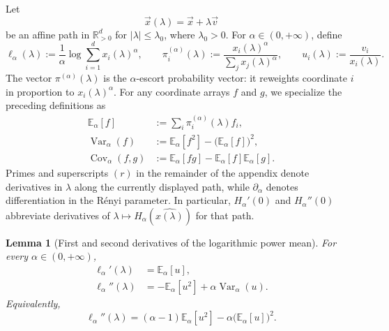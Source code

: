 \documentclass[aps,pra,11pt,onecolumn,nofootinbib,tightenlines]{revtex4-2}
\newtheorem{lemma}[theorem]{Lemma}
\theoremstyle{definition}
\begin{document}
Let
\begin{equation}
 \vec x(\lambda)=\vec x+\lambda\vec v
 \label{eq:app-affine-path}
\end{equation}
be an affine path in $\mathbb R^d_{>0}$ for $|\lambda|\leq\lambda_0$, where
$\lambda_0>0$.  For $\alpha\in(0,+\infty)$, define
\begin{equation}
 \ell_\alpha(\lambda)
 :=\frac1\alpha\log\sum_{i=1}^d x_i(\lambda)^\alpha,
 \qquad
 \pi_i^{(\alpha)}(\lambda)
 :=\frac{x_i(\lambda)^\alpha}{\sum_jx_j(\lambda)^\alpha},
 \qquad
 u_i(\lambda):=\frac{v_i}{x_i(\lambda)}.
 \label{eq:app-ell-pi-u}
\end{equation}
The vector $\pi^{(\alpha)}(\lambda)$ is the $\alpha$-escort probability vector:
it reweights coordinate $i$ in proportion to $x_i(\lambda)^\alpha$.
For any coordinate arrays $f$ and $g$, we specialize the preceding definitions
as
\begin{align}
\mathbb E_\alpha[f]
&:=\sum_i\pi_i^{(\alpha)}(\lambda)f_i,
\label{eq:app-escort-expectation}\\
\operatorname{Var}_\alpha(f)
&:=\mathbb E_\alpha[f^2]-\bigl(\mathbb E_\alpha[f]\bigr)^2,
\label{eq:app-escort-variance}\\
\operatorname{Cov}_\alpha(f,g)
&:=\mathbb E_\alpha[fg]-\mathbb E_\alpha[f]\mathbb E_\alpha[g].
\label{eq:app-escort-covariance}
\end{align}
Primes and superscripts $(r)$ in the remainder of the appendix denote
derivatives in $\lambda$ along the currently displayed path, while
$\partial_\alpha$ denotes differentiation in the R\'enyi parameter.  In
particular, $H_\alpha'(0)$ and $H_\alpha''(0)$ abbreviate derivatives of
$\lambda\mapsto H_\alpha(\widehat{x(\lambda)})$ for that path.

\begin{lemma}[First and second derivatives of the logarithmic power mean]
\label{lem:app-ell-derivatives}
For every $\alpha\in(0,+\infty)$,
\begin{align}
 \ell_\alpha'(\lambda)
 &=\mathbb E_\alpha[u],
 \label{eq:app-ell-first}\\
 \ell_\alpha''(\lambda)
 &=-\mathbb E_\alpha[u^2]
   +\alpha\operatorname{Var}_\alpha(u).
 \label{eq:app-ell-second}
\end{align}
Equivalently,
\begin{equation}
 \ell_\alpha''(\lambda)
 =(\alpha-1)\mathbb E_\alpha[u^2]
 -\alpha\bigl(\mathbb E_\alpha[u]\bigr)^2.
 \label{eq:app-ell-second-alternative}
\end{equation}
\end{lemma}
\end{document}
